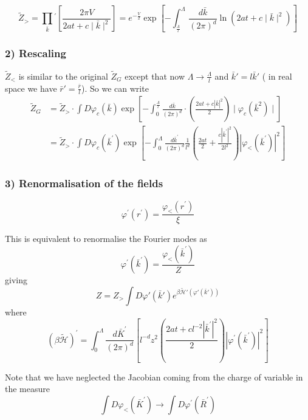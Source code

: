 \documentclass[../../Main/Main.tex]{subfiles}
\begin{document}
$$\tilde{Z}_{>} = \prod_{\bar{k}}{}^\prime\left[ \frac{2\pi V}{2at + c\mid \bar{k}\mid^{2}} \right] = e^{-\frac{V}{2}}\exp\left[ - \int _{\frac{\Lambda}{l}}^{\Lambda} \, \frac{d\bar{k}}{(2\pi)^{d}}\ln(2at + c\mid \bar{k}\mid^{2})  \right]$$

\subsubsection*{2) Rescaling}

$\tilde{Z}_{<}$ is similar to the original $\tilde{Z}_{G}$ except that now $\Lambda \to \frac{\Lambda}{l}$ and $\bar{k}' = l\bar{k}'$ ( in real space we have $\bar{r}' = \frac{\bar{r}}{l}$). So we can write
$$
\begin{aligned}
\tilde{Z}_G &=\tilde{Z}_{>} \cdot \int D \varphi_c(\bar{k}) \exp \left[-\int_0^{\frac{\Lambda}{l}} \frac{d \bar{k}}{(2 \pi)^d} \cdot\left(\frac{2 a t+c|\bar{k}|^{2}}{2}\right) \mid \varphi_c\left(\bar{k}^2\right)\mid \right] \\
& =\tilde{Z}_{>} \cdot \int D \varphi_c\left(\bar{k}^{\prime}\right) \exp \left[-\int_0^\Lambda \frac{d \bar{k}^{\prime}}{(2 \pi)^d} \frac{1}{l^{d}}\left(\frac{2 a t}{2}+\frac{c\left|\bar{k}^{\prime}\right|^2}{2 l^2}\right)\left|\varphi_<\left(\bar{k}^{\prime}\right)\right|^2\right]
\end{aligned}
$$

\subsubsection*{3) Renormalisation of the fields}
$$
\varphi^{\prime}\left(r^{\prime}\right)=\frac{\varphi_{<}\left(r^{\prime}\right)}{\xi}
$$

This is equivalent to renormalise the Fourier modes as
$$
\varphi^{\prime}\left(\bar{k}^{\prime}\right)=\frac{\varphi_{<}\left(\bar{k}^{\prime}\right)}{Z}
$$
giving
$$
Z = Z_{>}\int D\varphi'(\bar{k}') e^{\beta  \tilde{\mathcal{H}}'(\varphi'(\bar{k}'))}
$$
where
$$
(\beta \tilde{\mathcal{H}})^{\prime}=\int_0^{\Lambda} \frac{d \bar{K}^{\prime}}{(2 \pi)^{d}}\left[l^{-d} z^2\left(\frac{2 a t+c l^{-2}\left|\bar{k}^{\prime}\right|^2}{2}\right)\left|\varphi^{\prime}\left(\bar{k}^{\prime}\right)\right|^2\right]
$$

Note that we have neglected the Jacobian coming from the charge of variable in the measure
$$
\int D \varphi_{<}\left(\bar{K}^{\prime}\right) \rightarrow \int D \varphi^{\prime}\left(\bar{R}^{\prime}\right)
$$
\end{document}
